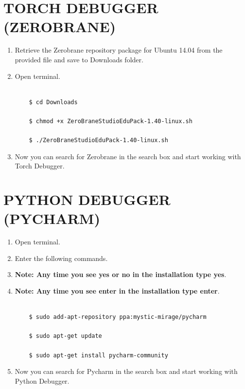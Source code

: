 \documentclass[12pt]{article}
\begin{document}
\section{TORCH DEBUGGER (ZEROBRANE)}

\begin{enumerate}
  \item Retrieve the Zerobrane repository package for Ubuntu 14.04 from the provided file and save to Downloads folder.
  \item Open terminal.

\begin{lstlisting}

    $ cd Downloads

    $ chmod +x ZeroBraneStudioEduPack-1.40-linux.sh

    $ ./ZeroBraneStudioEduPack-1.40-linux.sh
\end{lstlisting}

   \item Now you can search for Zerobrane in the search box and start working with Torch Debugger.
\end{enumerate}
\newpage
\section{PYTHON DEBUGGER (PYCHARM)}

\begin{enumerate}
    \item Open terminal.
    \item Enter the following commands.
    \item \textbf{Note: Any time you see yes or no in the installation type yes}.
    \item \textbf{Note: Any time you see enter in the installation type enter}.


\begin{lstlisting}

    $ sudo add-apt-repository ppa:mystic-mirage/pycharm

    $ sudo apt-get update

    $ sudo apt-get install pycharm-community

\end{lstlisting}

   \item Now you can search for Pycharm in the search box and start working with Python Debugger.
\end{enumerate}
\newpage
\end{document}

